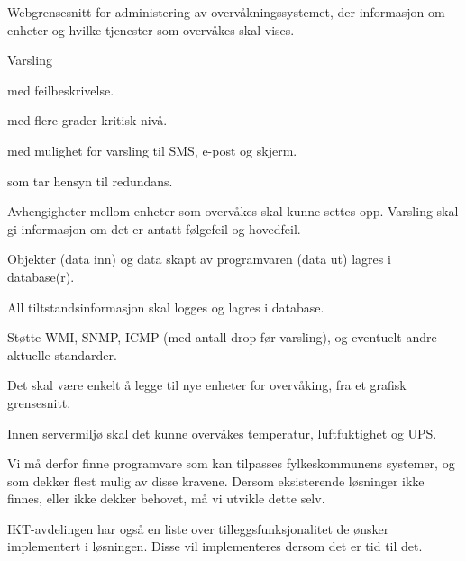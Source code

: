 \begin{itemize*}
	\item Webgrensesnitt for administering av overvåkningssystemet, der informasjon om enheter og hvilke tjenester som overvåkes skal vises.
	\item Varsling
	\begin{itemize*} 
		\item med feilbeskrivelse.
		\item med flere grader kritisk nivå.
		\item med mulighet for varsling til SMS, e-post og skjerm.
		\item som tar hensyn til redundans.
	\end{itemize*}
	\item Avhengigheter mellom enheter som overvåkes skal kunne settes opp. Varsling skal gi informasjon om det er antatt følgefeil og hovedfeil.
	\item Objekter (data inn) og data skapt av programvaren (data ut) lagres i database(r).
	\item All tiltstandsinformasjon skal logges og lagres i database.
	\item Støtte WMI, SNMP, ICMP (med antall drop før varsling), og eventuelt andre aktuelle standarder.
	\item Det skal være enkelt å legge til nye enheter for overvåking, fra et grafisk grensesnitt.
	\item Innen servermiljø skal det kunne overvåkes temperatur, luftfuktighet og UPS.
\end{itemize*}

Vi må derfor finne programvare som kan tilpasses fylkeskommunens systemer, og som dekker flest mulig av disse kravene. Dersom eksisterende løsninger ikke finnes, eller ikke dekker behovet, må vi utvikle dette selv.

IKT-avdelingen har også en liste over tilleggsfunksjonalitet de ønsker implementert i løsningen. Disse vil implementeres dersom det er tid til det.

